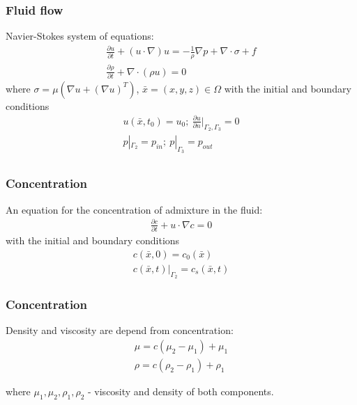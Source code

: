 \documentclass[14pt]{beamer}
\begin{document}
\begin{frame}
\frametitle{Fluid flow}
Navier-Stokes system of equations:
\begin{gather}
    \label{eq:motion}
    \frac{\partial u}{\partial t} + (u \cdot \nabla) u = - \frac{1}{\rho} \nabla p + \nabla \cdot \sigma + f\\
    \label{eq:continuity}
    \frac{\partial \rho}{\partial t} + \nabla \cdot (\rho u) = 0
\end{gather}
where $\sigma = \mu (\nabla u + (\nabla u)^{T})$, $\bar{x} = (x, y, z) \in \Omega$ with the initial and boundary conditions
\begin{gather*}
    u(\bar{x}, t_0) = u_0;\ \frac{\partial u}{\partial n}|_{\Gamma_2, \Gamma_3} = 0\\
    p|_{\Gamma_2} = p_{in};\ p|_{\Gamma_3} = p_{out} \\
\end{gather*}

\end{frame}

\begin{frame}
\frametitle{Concentration}
An equation for the concentration of admixture in the fluid:
\begin{gather}
    \label{eq:concentration}
    \frac{\partial c}{\partial t} + u \cdot \nabla c = 0
\end{gather}
with the initial and boundary conditions
\begin{gather*}
    c(\bar{x}, 0) = c_0(\bar{x})\\
    c(\bar{x}, t)|_{\Gamma_2} = c_s(\bar{x}, t)
\end{gather*}

\end{frame}

\begin{frame}
\frametitle{Concentration}
Density and viscosity are depend from concentration:
\begin{gather}
    \label{eq:concentration_viscosity}
    \mu = c (\mu_2 - \mu_1) + \mu_1\\
    \label{eq:concentration_density}
    \rho = c (\rho_2 - \rho_1) + \rho_1
\end{gather}

where $\mu_1, \mu_2, \rho_1, \rho_2$ - viscosity and density of both components.
\end{frame}
\end{document}
